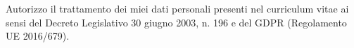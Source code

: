 \documentclass[%
               doublesided,
               paper=a4,
               fontsize=10pt
              ]{Rubini-Mattia-resume}
\begin{document}






\vspace*{\fill}
Autorizzo il trattamento dei miei dati personali presenti nel curriculum vitae ai sensi del Decreto Legislativo 30 giugno 2003, n. 196 e del GDPR (Regolamento UE 2016/679).
\end{document}
